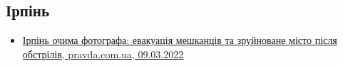  
 
 
 
 
\subsection{Ірпінь}
\label{sec:topics.vojna.irpen}


\begin{itemize} %
\item \hyperlink{09_03_2022.stz.news.ua.pravda.1.irpen}{%
Ірпінь очима фотографа: евакуація мешканців та зруйноване місто після обстрілів, %
pravda.com.ua, 09.03.2022%
}

\end{itemize} %

